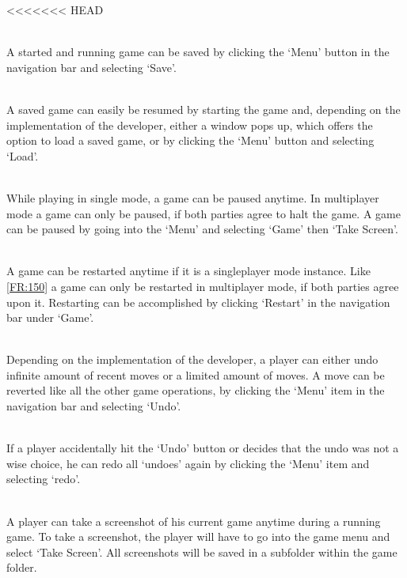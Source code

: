 \vspace{.5cm}

\begin{description}
<<<<<<< HEAD
  	\item[\textlabel{/FR140/}{FR:140}] \textbf{}  \\
  	A started and running game can be saved by clicking the `Menu' button in the navigation bar and selecting `Save'.
 	\item[\textlabel{/FR150/}{FR:150}] \textbf{}  \\
 	A saved game can easily be resumed by starting the game and, depending on the implementation of the developer, either a window pops up, which offers the option to load a saved game, or by clicking the `Menu' button and selecting `Load'.
	\item[\textlabel{/FR160/}{FR:160}] \textbf{}  \\
	While playing in single mode, a game can be paused anytime. In multiplayer mode a game can only be paused, if both parties agree to halt the game. A game can be paused by going into the `Menu' and selecting `Game' then `Take Screen'.
	\item[\textlabel{/FR170/}{FR:170}] \textbf{}  \\
	A game can be restarted anytime if it is a singleplayer mode instance. Like \ref{FR:150} a game can only be restarted in multiplayer mode, if both parties agree upon it. Restarting can be accomplished by clicking `Restart' in the navigation bar under `Game'.
	\item[\textlabel{/FR180/}{FR:180}] \textbf{}  \\
	Depending on the implementation of the developer, a player can either \gls{undo} infinite amount of recent moves or a limited amount of moves. A move can be reverted like all the other game operations, by clicking the `Menu' item in the navigation bar and selecting `Undo'.
	\item[\textlabel{/FR190/}{FR:190}] \textbf{} \\
	If a player accidentally hit the `Undo' button or decides that the undo was not a wise choice, he can redo all `undoes' again by clicking the `Menu' item and selecting `\Gls{redo}'.
	\item[\textlabel{/FR200/}{FR:200}] \textbf{} \\
	A player can take a screenshot of his current game anytime during a running game. To take a screenshot, the player will have to go into the game menu and select `Take Screen'. All screenshots will be saved in a subfolder within the game folder.
\end{description}
